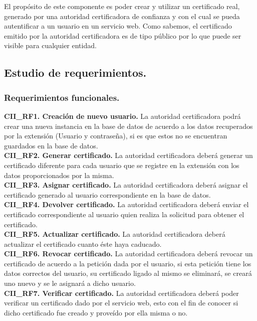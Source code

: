 \documentclass[12pt, a4paper, titlepage]{report}
\begin{document}
	        El propósito de este componente es poder crear y utilizar un certificado real, generado por una autoridad certificadora de confianza y con el cual se pueda autentificar a un usuario en un servicio web. Como sabemos, el certificado emitido por la autoridad certificadora es de tipo público por lo que puede ser visible para cualquier entidad.\\
	       
	        \subsection{Estudio de requerimientos.}
	            \subsubsection{Requerimientos funcionales.}
	            {\setlength{\parindent}{12pt}
				
				\textbf{CII\_RF1. Creación de nuevo usuario.} La autoridad certificadora podrá crear una nueva instancia en la base de datos de acuerdo a los datos recuperados por la extensión (Usuario y contraseña), si es que estos no se encuentran guardados en la base de datos.\\

				\textbf{CII\_RF2. Generar certificado.} La autoridad certificadora deberá generar un certificado diferente para cada usuario que se registre en la extensión con los datos proporcionados por la misma.\\
				
				\textbf{CII\_RF3. Asignar certificado.} La autoridad certificadora deberá asignar el certificado generado al usuario correspondiente en la base de datos.\\
				
				\textbf{CII\_RF4. Devolver certificado.} La autoridad certificadora deberá enviar el certificado correspondiente al usuario quien realiza la solicitud para obtener el certificado.\\
				
				\textbf{CII\_RF5. Actualizar certificado.} La autoridad certificadora deberá actualizar el certificado cuanto éste haya caducado.\\
				
				\textbf{CII\_RF6. Revocar certificado.} La autoridad certificadora deberá revocar un certificado de acuerdo a la petición dada por el usuario, si esta petición tiene los datos correctos del usuario, su certificado ligado al mismo se eliminará, se creará uno nuevo y se le asignará a dicho usuario.\\
				
				\textbf{CII\_RF7. Verificar certificado.} La autoridad certificadora deberá poder verificar un certificado dado por el servicio web, esto con el fin de conocer si dicho certificado fue creado y proveído por ella misma o no.
                
		        }
		        
\end{document}
